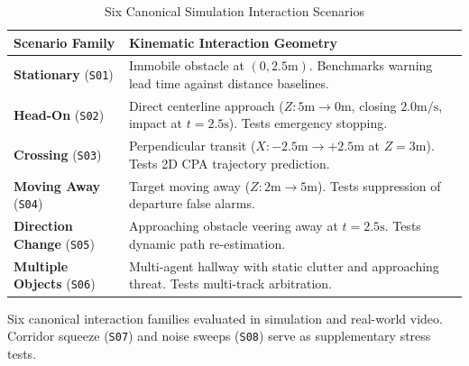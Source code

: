 \begin{table}[t]
\caption{Six Canonical Simulation Interaction Scenarios}
\label{tab:scenarios}
\centering
\footnotesize
\setlength{\tabcolsep}{4pt}
\begin{tabularx}{\columnwidth}{p{2.3cm}X}
\toprule
\textbf{Scenario Family} & \textbf{Kinematic Interaction Geometry} \\
\midrule
\textbf{Stationary} (\texttt{S01}) & Immobile obstacle at $(0, 2.5\text{m})$. Benchmarks warning lead time against distance baselines. \\
\addlinespace[2pt]
\textbf{Head-On} (\texttt{S02}) & Direct centerline approach ($Z: 5\text{m} \to 0\text{m}$, closing $2.0\text{m/s}$, impact at $t=2.5\text{s}$). Tests emergency stopping. \\
\addlinespace[2pt]
\textbf{Crossing} (\texttt{S03}) & Perpendicular transit ($X: -2.5\text{m} \to +2.5\text{m}$ at $Z=3\text{m}$). Tests 2D CPA trajectory prediction. \\
\addlinespace[2pt]
\textbf{Moving Away} (\texttt{S04}) & Target moving away ($Z: 2\text{m} \to 5\text{m}$). Tests suppression of departure false alarms. \\
\addlinespace[2pt]
\textbf{Direction Change} (\texttt{S05}) & Approaching obstacle veering away at $t=2.5\text{s}$. Tests dynamic path re-estimation. \\
\addlinespace[2pt]
\textbf{Multiple Objects} (\texttt{S06}) & Multi-agent hallway with static clutter and approaching threat. Tests multi-track arbitration. \\
\bottomrule
\end{tabularx}
\vspace{0.04cm}
\par{\raggedright \scriptsize Six canonical interaction families evaluated in simulation and real-world video. Corridor squeeze (\texttt{S07}) and noise sweeps (\texttt{S08}) serve as supplementary stress tests.\par}
\end{table}
